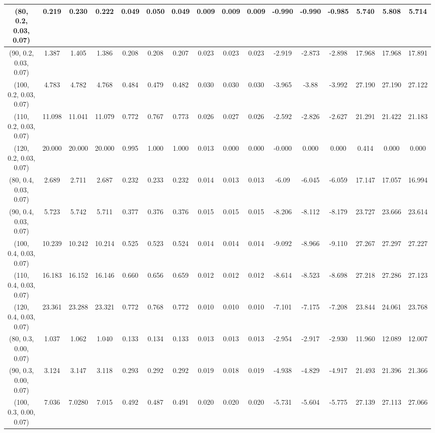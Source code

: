 \documentclass[preprint,12pt,1p]{elsarticle}
\begin{document}
\begin{table}[!h]
\begin{center}
{\begin{tabular}{| c | c | c | c | c | c | c| c| c| c| c| c| c| c| c| c|}
(80, 0.2, 0.03, 0.07)&  0.219 & 0.230 & 0.222 & 0.049 & 0.050 & 0.049 & 0.009 & 0.009 & 0.009 & -0.990 & -0.990 & -0.985 & 5.740 & 5.808& 5.714 \\ \hline    
(90, 0.2, 0.03, 0.07)&  1.387 & 1.405 & 1.386 & 0.208 & 0.208 & 0.207 & 0.023 & 0.023 & 0.023 & -2.919 & -2.873 & -2.898 & 17.968 & 17.968 & 17.891  \\ \hline    
(100, 0.2, 0.03, 0.07)&  4.783 & 4.782 & 4.768 & 0.484 & 0.479 & 0.482 & 0.030 & 0.030 & 0.030 & -3.965 & -3.88 & -3.992 & 27.190 & 27.190 & 27.122   \\ \hline    
(110, 0.2, 0.03, 0.07)&  11.098 & 11.041 & 11.079 & 0.772 & 0.767 & 0.773 & 0.026 & 0.027 & 0.026 & -2.592 & -2.826 & -2.627 & 21.291 & 21.422 & 21.183  \\ \hline    
(120, 0.2, 0.03, 0.07)&  20.000 & 20.000 & 20.000 & 0.995 & 1.000 & 1.000 & 0.013 & 0.000 & 0.000 & -0.000 & 0.000 & 0.000 & 0.414 & 0.000 & 0.000   \\ \hline    
(80, 0.4, 0.03, 0.07)&  2.689 & 2.711 & 2.687 & 0.232 & 0.233 & 0.232 & 0.014 & 0.013 & 0.013 & -6.09 & -6.045 & -6.059 & 17.147 & 17.057 & 16.994 \\ \hline    
(90, 0.4, 0.03, 0.07)&  5.723 & 5.742 & 5.711 & 0.377 & 0.376 & 0.376 & 0.015 & 0.015 & 0.015 & -8.206 & -8.112 & -8.179 & 23.727 & 23.666 & 23.614 \\ \hline    
(100, 0.4, 0.03, 0.07)&  10.239 & 10.242 & 10.214 & 0.525 & 0.523 & 0.524 & 0.014 & 0.014 & 0.014 & -9.092 & -8.966 & -9.110 & 27.267 & 27.297 & 27.227 \\ \hline    
(110, 0.4, 0.03, 0.07)&  16.183 & 16.152 & 16.146 & 0.660 & 0.656 & 0.659 & 0.012 & 0.012 & 0.012 & -8.614 & -8.523 & -8.698 & 27.218 & 27.286 & 27.123  \\ \hline    
(120, 0.4, 0.03, 0.07)& 23.361 & 23.288 & 23.321 & 0.772 & 0.768 & 0.772 & 0.010 & 0.010 & 0.010 & -7.101 & -7.175 & -7.208 & 23.844 & 24.061 & 23.768 \\ \hline    
(80, 0.3, 0.00, 0.07)&  1.037 & 1.062 & 1.040 & 0.133 & 0.134 & 0.133 & 0.013 & 0.013 & 0.013 & -2.954 & -2.917 & -2.930 & 11.960 & 12.089 & 12.007  \\ \hline    
(90, 0.3, 0.00, 0.07)&  3.124 & 3.147 & 3.118 & 0.293 & 0.292 & 0.292 & 0.019 & 0.018 & 0.019 & -4.938 & -4.829 & -4.917 & 21.493 & 21.396 & 21.366  \\ \hline    
(100, 0.3, 0.00, 0.07)&  7.036 & 7.0280 & 7.015 & 0.492 & 0.487 & 0.491 & 0.020 & 0.020 & 0.020 & -5.731 & -5.604 & -5.775 & 27.139 & 27.113 & 27.066 \\ \hline    

\end{tabular}}
\end{center}
\end{table}
\end{document}
